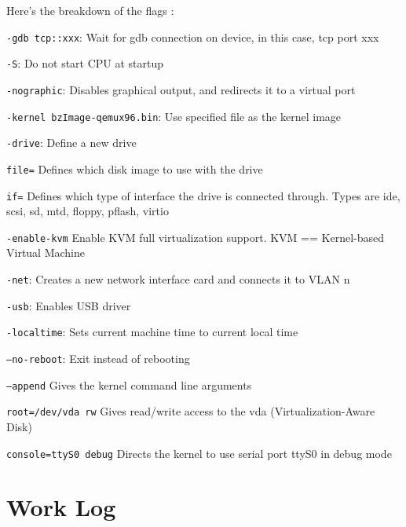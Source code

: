 \documentclass[10pt,letterpaper]{article}
\begin{document}
      \noindent Here's the breakdown of the flags \cite{anthonyl.2010}:
      \begin{description}
          \item \texttt{-gdb tcp::xxx}: Wait for gdb connection on device, in
          this case, tcp port xxx
          \item \texttt{-S}: Do not start CPU at startup
          \item \texttt{-nographic}: Disables graphical output, and redirects it
          to a virtual port
          \item \texttt{-kernel bzImage-qemux96.bin}: Use specified file as the
          kernel image
          \item \texttt{-drive}: Define a new drive
          \begin{description}
            \item \texttt{file=} Defines which disk image to use with the drive
            \item \texttt{if=} Defines which type of interface the drive is connected
            through. Types are ide, scsi, sd, mtd, floppy, pflash, virtio
          \end{description}
          \item \texttt{-enable-kvm} Enable KVM full virtualization support. KVM
          == Kernel-based Virtual Machine
          \item \texttt{-net}: Creates a new network interface card and connects
          it to VLAN n
          \item \texttt{-usb}: Enables USB driver
          \item \texttt{-localtime}: Sets current machine time to current local
          time
          \item \texttt{--no-reboot}: Exit instead of rebooting
          \item \texttt{--append} Gives the kernel command line arguments
          \begin{description}
            \item \texttt{root=/dev/vda rw} Gives read/write access to the vda
            (Virtualization-Aware Disk)
            \item \texttt{console=ttyS0 debug} Directs the kernel to use serial
            port ttyS0 in debug mode
          \end{description}
      \end{description}
\section{Work Log}
\end{document}
